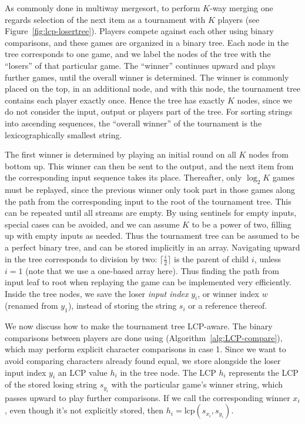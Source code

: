 \documentclass[a4paper]{myjournal}
\newcommand{\lcp}{\mathrm{lcp}}
\begin{document}
As commonly done in multiway mergesort, to perform $K$-way merging one regards
selection of the next item as a tournament with $K$ players (see
Figure~\ref{fig:lcp-losertree}). Players compete against each other using binary
comparisons, and these games are organized in a binary tree. Each node in the
tree corresponds to one game, and we label the nodes of the tree with the
``losers'' of that particular game. The ``winner'' continues upward and plays
further games, until the overall winner is determined. The winner is commonly
placed on the top, in an additional node, and with this node, the tournament
tree contains each player exactly once.  Hence the tree has exactly $K$ nodes,
since we do not consider the input, output or players part of the tree.  For
sorting strings into ascending sequences, the ``overall winner'' of the
tournament is the lexicographically smallest string.

The first winner is determined by playing an initial round on all $K$ nodes from
bottom up.  This winner can then be sent to the output, and the next item from
the corresponding input sequence takes its place.  Thereafter, only $\log_2 K$
games must be replayed, since the previous winner only took part in those games
along the path from the corresponding input to the root of the tournament
tree. This can be repeated until all streams are empty. By using sentinels for
empty inputs, special cases can be avoided, and we can assume $K$ to be a power
of two, filling up with empty inputs as needed. Thus the tournament tree can be
assumed to be a perfect binary tree, and can be stored implicitly in an
array. Navigating upward in the tree corresponds to division by two: $\lceil
\frac{i}{2} \rceil$ is the parent of child $i$, unless $i=1$ (note that we use a
one-based array here). Thus finding the path from input leaf to root when
replaying the game can be implemented very efficiently. Inside the tree nodes,
we save the loser \emph{input index} $y_i$, or winner index $w$ (renamed from
$y_1$), instead of storing the string $s_i$ or a reference thereof.

We now discuss how to make the tournament tree LCP-aware. The binary comparisons
between players are done using \LCPCompare (Algorithm~\ref{alg:LCP-compare}),
which may perform explicit character comparisons in case 1. Since we want to
avoid comparing characters already found equal, we store alongside the loser
input index $y_i$ an LCP value $h_i$ in the tree node. The LCP $h_i$ represents
the LCP of the stored losing string $s_{y_i}$ with the particular game's winner
string, which passes upward to play further comparisons. If we call the
corresponding winner $x_i$, even though it's not explicitly stored, then $h_i =
\lcp(s_{x_i},s_{y_i})$.
\end{document}
